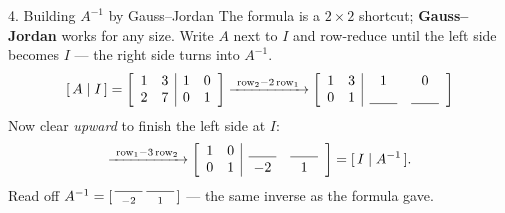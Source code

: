 \documentclass[10pt]{article}
\begin{document}
\begin{notesbox}{4. Building $A^{-1}$ by Gauss--Jordan}
The formula is a $2\times2$ shortcut; \textbf{Gauss--Jordan} works for any size. Write $A$ next to
$I$ and row-reduce until the left side becomes $I$ --- the right side turns into $A^{-1}$.
\[
  [\,A \mid I\,] = \left[\begin{array}{cc|cc} 1 & 3 & 1 & 0 \\ 2 & 7 & 0 & 1 \end{array}\right]
  \xrightarrow{\ \text{row}_2 - 2\,\text{row}_1\ }
  \left[\begin{array}{cc|cc} 1 & 3 & 1 & 0 \\ 0 & 1 & \blank{0.7cm} & \blank{0.7cm} \end{array}\right]
\]
Now clear \emph{upward} to finish the left side at $I$:
\[
  \xrightarrow{\ \text{row}_1 - 3\,\text{row}_2\ }
  \left[\begin{array}{cc|cc} 1 & 0 & \blank{0.7cm} & \blank{0.7cm} \\ 0 & 1 & -2 & 1 \end{array}\right]
  = [\,I \mid A^{-1}\,].
\]
Read off $A^{-1}=\begin{bsmallmatrix}\blank{0.7cm} & \blank{0.7cm}\\[2pt]-2 & 1 \end{bsmallmatrix}$ ---
the same inverse as the formula gave.
\end{notesbox}
\end{document}
